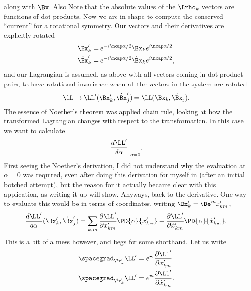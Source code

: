 {along with \(\Bv\).  Also Note that the absolute values of the \(\Brho_k\) vectors are functions of dot products.
%
Now we are in shape to compute the conserved ``current'' for a rotational symmetry.  Our vectors and their derivatives are explicitly rotated
%
\begin{equation}\label{eqn:goldsteinCh12:320}
\begin{aligned}
{\Bx}_k' &= e^{-i\ncap \alpha/2} {\Bx}_k e^{i\ncap\alpha/2} \\
\dot{\Bx}_k' &= e^{-i\ncap \alpha/2} \dot{\Bx}_k e^{i\ncap\alpha/2},
\end{aligned}
\end{equation}
%
and our Lagrangian is assumed, as above with all vectors coming in dot product pairs, to have rotational invariance when all the vectors in the system are rotated
%
\begin{equation}\label{eqn:goldsteinCh12:340}
\LL  \rightarrow \LL'(\Bx_k', \dot{\Bx}_j') = \LL(\Bx_k, \dot{\Bx}_j) .
\end{equation}
%
The essence of Noether's theorem was applied chain rule, looking at how the transformed Lagrangian changes with respect to the transformation.  In this case
we want to calculate
%
\begin{equation}\label{eqn:goldsteinCh12:360}
{\left. \frac{d \LL'}{d\alpha} \right\vert}_{\alpha=0}.
\end{equation}
%
First seeing the Noether's derivation, I did not understand why the evaluation at \(\alpha=0\) was required, even after doing this
derivation for myself in  (after an initial botched attempt), but
the reason for it actually became clear with this application, as writing it up will show.
%
Anyways, back to the derivative.  One way to evaluate this would be in terms of coordinates, writing \(\Bx_k' = \Be^m x_{km}'\),
%
\begin{equation}\label{eqn:goldsteinCh12:380}
\frac{d \LL'}{d\alpha} (\Bx_k', \dot{\Bx}_j')
= \sum_{k,m} \frac{\partial \LL'}{\partial x_{km}'} \PD{\alpha}{x_{km}'} + \frac{\partial \LL'}{\partial \dot{x}_{km}'} \PD{\alpha}{\dot{x}_{km}'} .
\end{equation}
%
This is a bit of a mess however, and begs for some shorthand.  Let us write
%
\begin{equation}\label{eqn:goldsteinCh12:400}
\begin{aligned}
\spacegrad_{\Bx_k'} \LL' &= e^m \frac{\partial \LL'}{\partial x_{km}'} \\
\spacegrad_{\dot{\Bx}_k'} \LL' &= e^m \frac{\partial \LL'}{\partial \dot{x}_{km}'}.

\end{aligned}
\end{equation}}
